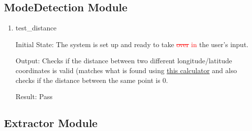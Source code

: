 \documentclass[12pt, titlepage]{article}
\begin{document}
\subsection{ModeDetection Module}

\begin{enumerate}
    \item{test\_distance} \label{test_distance}

    Initial State: The system is set up and ready to take \textcolor{red}{\sout{over} in} the user’s input.

    Output: Checks if the distance between two different longitude/latitude coordinates is valid (matches what is found using \href{https://www.nhc.noaa.gov/gccalc.shtml}{this calculator} and also checks if the distance between the same point is 0.

    Result: Pass
    
\end{enumerate}

\subsection{Extractor Module}
\end{document}
